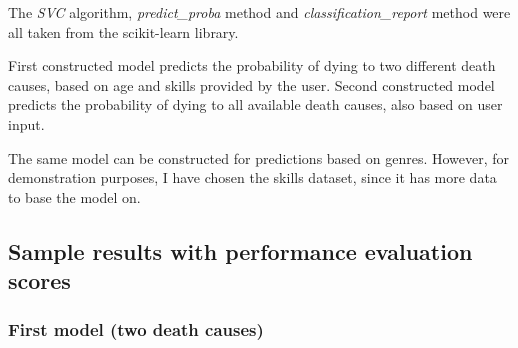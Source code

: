 \documentclass{article}
\begin{document}
The \textit{SVC }algorithm, \textit{predict\_proba} method and \textit{classification\_report} method were all taken from the scikit-learn library.

First constructed model predicts the probability of dying to two different death causes, based on age and skills provided by the user.
Second constructed model predicts the probability of dying to all available death causes, also based on user input.

The same model can be constructed for predictions based on genres. However, for demonstration purposes, I have chosen the skills dataset, since it has more data to base the model on.


\subsection{Sample results with performance evaluation scores}


\subsubsection{First model (two death causes)}
\end{document}
